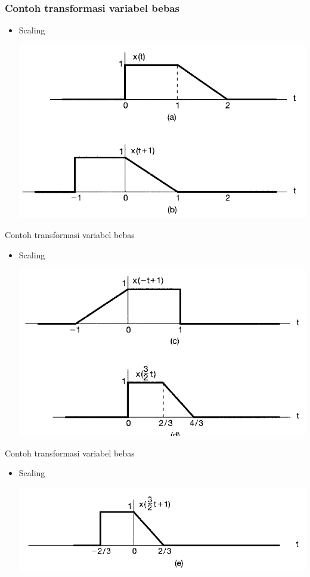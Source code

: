 \documentclass[pdflatex,compress,mathserif]{beamer}
\begin{document}
\begin{frame}
	\frametitle{Contoh transformasi variabel bebas}
	\begin{itemize}
		\item Scaling
		\begin{center}
			\includegraphics[width=0.7\linewidth]{img/img23}
		\end{center}
	\end{itemize}
\end{frame}

\begin{frame}{Contoh transformasi variabel bebas}
	\begin{itemize}
		\item Scaling
		\begin{center}
			\includegraphics[width=0.7\linewidth]{img/img24}
		\end{center}
	\end{itemize}
\end{frame}

\begin{frame}{Contoh transformasi variabel bebas}
	\begin{itemize}
		\item Scaling
		\begin{center}
			\includegraphics[width=0.7\linewidth]{img/img25}
		\end{center}
	\end{itemize}
\end{frame}
\end{document}

